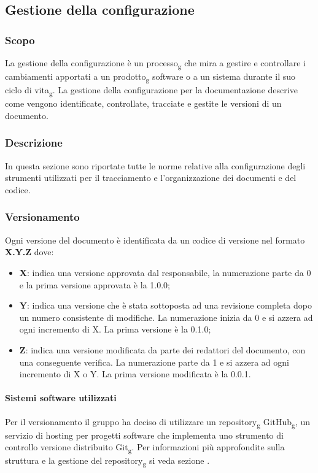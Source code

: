\subsection{Gestione della configurazione}
\subsubsection{Scopo}
La gestione della configurazione è un processo\textsubscript{g} che mira a gestire e controllare i cambiamenti apportati a un prodotto\textsubscript{g} software o a un sistema durante il suo ciclo di vita\textsubscript{g}. 
La gestione della configurazione per la documentazione descrive come vengono identificate, controllate, tracciate e gestite le versioni di un documento.
\subsubsection{Descrizione}
In questa sezione sono riportate tutte le norme relative alla configurazione degli strumenti utilizzati per il tracciamento e l’organizzazione dei documenti e del codice.
\subsubsection{Versionamento \label{versionamento}}
Ogni versione del documento è identificata da un codice di versione nel formato \textbf{X.Y.Z} dove:
\begin{itemize} 
    \item \textbf{X}: indica una versione approvata dal responsabile, la numerazione parte da 0
    e la prima versione approvata è la 1.0.0;
    \item \textbf{Y}: indica una versione che è stata sottoposta ad una revisione completa dopo un numero consistente di modifiche. 
    La numerazione inizia da 0 e si azzera ad ogni incremento di X. La prima versione è la 0.1.0;
    \item \textbf{Z}: indica una versione modificata da parte dei redattori del documento, con una conseguente verifica.
    La numerazione parte da 1 e si azzera ad ogni incremento di X o Y. La prima versione modificata è la 0.0.1.
\end{itemize}

\paragraph{Sistemi software utilizzati}
Per il versionamento il gruppo ha deciso di utilizzare un repository\textsubscript{g} GitHub\textsubscript{g}, un servizio di hosting per progetti software che implementa uno strumento di controllo versione distribuito Git\textsubscript{g}.
Per informazioni più approfondite sulla struttura e la gestione del repository\textsubscript{g} si veda sezione .